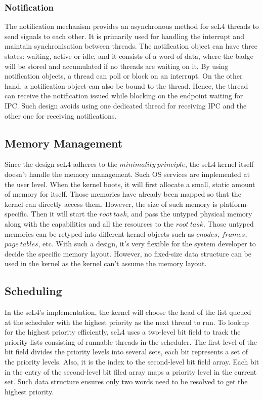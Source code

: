 \subsubsection{Notification}

The notification mechanism provides an asynchronous method for seL4 threads to send signals to each other. It is primarily used for handling the interrupt and maintain synchronisation between threads. The notification object can have three states: waiting, active or idle, and it consists of a word of data, where the badge will be stored and accumulated if no threads are waiting on it. By using notification objects, a thread can poll or block on an interrupt. On the other hand, a notification object can also be bound to the thread. Hence, the thread can receive the notification issued while blocking on the endpoint waiting for IPC. Such design avoids using one dedicated thread for receiving IPC and the other one for receiving notifications.

\subsection{Memory Management}

Since the design seL4 adheres to the $minimality\  principle$, the seL4 kernel itself doesn't handle the memory management. Such OS services are implemented at the user level. When the kernel boots, it will first allocate a small, static amount of memory for itself. Those memories have already been mapped so that the kernel can directly access them. However, the size of such memory is platform-specific. Then it will start the $root\ task$, and pass the untyped physical memory along with the capabilities and all the resources to the $root\ task$. Those untyped memories can be retyped into different kernel objects such as $cnodes$, $frames$, $page\ tables$, etc. With such a design, it's very flexible for the system developer to decide the specific memory layout. However, no fixed-size data structure can be used in the kernel as the kernel can't assume the memory layout.

\subsection{Scheduling}

In the seL4's implementation, the kernel will choose the head of the list queued at the scheduler with the highest priority as the next thread to run. To lookup for the highest priority efficiently, seL4 uses a two-level bit field to track the priority lists consisting of runnable threads in the scheduler. The first level of the bit field divides the priority levels into several sets, each bit represents a set of the priority levels. Also, it is the index to the second-level bit field array. Each bit in the entry of the second-level bit filed array maps a priority level in the current set. Such data structure ensures only two words need to be resolved to get the highest priority.

